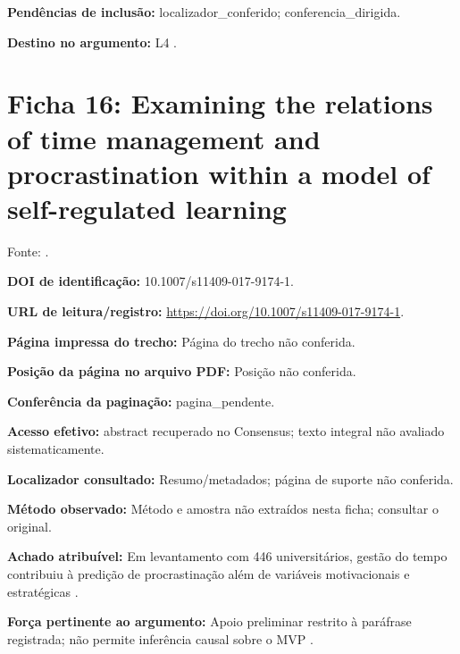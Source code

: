 \noindent\textbf{Pendências de inclusão:} localizador\_conferido; conferencia\_dirigida.\par\medskip

\noindent\textbf{Destino no argumento:} L4 .

\clearpage\section*{Ficha 16: Examining the relations of time management and procrastination within a model of self-regulated learning}

Fonte: \citet{education_wolters2017}.

\noindent\textbf{DOI de identificação:} 10.1007/s11409-017-9174-1.\par\medskip

\noindent\textbf{URL de leitura/registro:} \url{https://doi.org/10.1007/s11409-017-9174-1}.\par\medskip

\noindent\textbf{Página impressa do trecho:} Página do trecho não conferida.\par\medskip

\noindent\textbf{Posição da página no arquivo PDF:} Posição não conferida.\par\medskip

\noindent\textbf{Conferência da paginação:} pagina\_pendente.\par\medskip

\noindent\textbf{Acesso efetivo:} abstract recuperado no Consensus; texto integral não avaliado sistematicamente.\par\medskip

\noindent\textbf{Localizador consultado:} Resumo/metadados; página de suporte não conferida.\par\medskip

\noindent\textbf{Método observado:} Método e amostra não extraídos nesta ficha; consultar o original.\par\medskip

\noindent\textbf{Achado atribuível:} Em levantamento com 446 universitários, gestão do tempo contribuiu à predição de procrastinação além de variáveis motivacionais e estratégicas \citep{education_wolters2017}.\par\medskip

\noindent\textbf{Força pertinente ao argumento:} Apoio preliminar restrito à paráfrase registrada; não permite inferência causal sobre o MVP \citep{education_wolters2017}.\par\medskip

